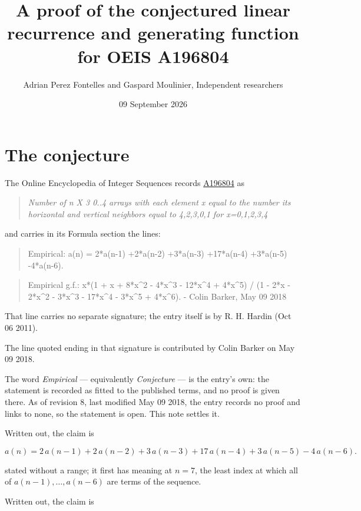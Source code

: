\documentclass[11pt]{article}
\title{A proof of the conjectured linear recurrence and generating function for OEIS A196804}
\author{Adrian Perez Fontelles and Gaspard Moulinier, Independent researchers}
\date{09 September 2026}
\theoremstyle{definition}
\begin{document}
\maketitle
\section{The conjecture}

The Online Encyclopedia of Integer Sequences records \href{https://oeis.org/A196804}{A196804} as

\begin{quote}\itshape Number of n X 3 0..4 arrays with each element x equal to the number its horizontal and vertical neighbors equal to 4,2,3,0,1 for x=0,1,2,3,4\end{quote}

and carries in its Formula section the lines:

\begin{quote}\ttfamily Empirical: a(n) = 2*a(n-1) +2*a(n-2) +3*a(n-3) +17*a(n-4) +3*a(n-5) -4*a(n-6).\end{quote}

\begin{quote}\ttfamily Empirical g.f.: x*(1 + x + 8*x\textasciicircum{}2 - 4*x\textasciicircum{}3 - 12*x\textasciicircum{}4 + 4*x\textasciicircum{}5) / (1 - 2*x - 2*x\textasciicircum{}2 - 3*x\textasciicircum{}3 - 17*x\textasciicircum{}4 - 3*x\textasciicircum{}5 + 4*x\textasciicircum{}6). - Colin Barker, May 09 2018\end{quote}

That line carries no separate signature; the entry itself is by R. H. Hardin (Oct 06 2011).

The line quoted ending in that signature is contributed by Colin Barker on May 09 2018.

The word {\itshape Empirical} --- equivalently {\itshape Conjecture} --- is the entry's own: the statement is recorded as fitted to the published terms, and no proof is given there. As of revision 8, last modified May 09 2018, the entry records no proof and links to none, so the statement is open. This note settles it.

Written out, the claim is

\[a(n) = 2\,a(n-1) + 2\,a(n-2) + 3\,a(n-3) + 17\,a(n-4) + 3\,a(n-5) - 4\,a(n-6).\]

stated without a range; it first has meaning at $n = 7$, the least index at which all of $a(n-1),\dots,a(n-6)$ are terms of the sequence.

Written out, the claim is
\end{document}
